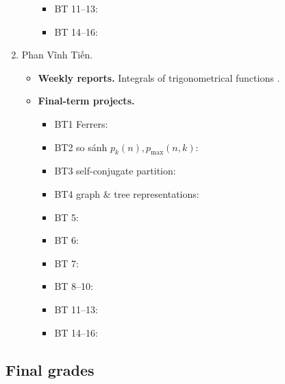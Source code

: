 \documentclass{article}
\begin{document}
\begin{enumerate}
\begin{itemize}
\begin{itemize}
            \item BT 11--13:
            \item BT 14--16:
        \end{itemize}
    \end{itemize}
    \item {\sc Phan Vĩnh Tiến.}
    \begin{itemize}
        \item {\bf Weekly reports.} Integrals of trigonometrical functions .
        \item {\bf Final-term projects.}
        \begin{itemize}
            \item BT1 Ferrers:
            \item BT2 so sánh $p_k(n),p_{\max}(n,k)$:
            \item BT3 self-conjugate partition:
            \item BT4 graph \& tree representations:
            \item BT 5:
            \item BT 6:
            \item BT 7:
            \item BT 8--10:
            \item BT 11--13:
            \item BT 14--16:
        \end{itemize}
    \end{itemize}
\end{enumerate}


\subsection{Final grades}
\end{document}
